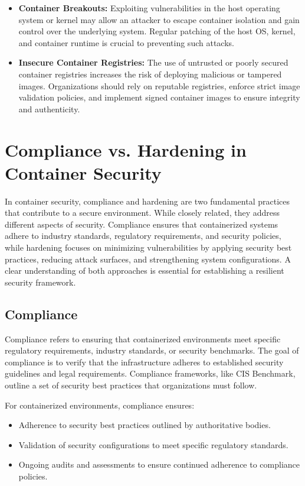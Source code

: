 \documentclass[12pt,a4paper]{report}
\begin{document}
\begin{itemize}
    \item \textbf{Container Breakouts:}  
    Exploiting vulnerabilities in the host operating system or kernel may allow an attacker to escape container isolation and gain control over the underlying system. Regular patching of the host OS, kernel, and container runtime is crucial to preventing such attacks.

    \item \textbf{Insecure Container Registries:}  
    The use of untrusted or poorly secured container registries increases the risk of deploying malicious or tampered images. Organizations should rely on reputable registries, enforce strict image validation policies, and implement signed container images to ensure integrity and authenticity.
\end{itemize}
\section{Compliance vs. Hardening in Container Security}

In container security, compliance and hardening are two fundamental practices that contribute to a secure environment. While closely related, they address different aspects of security. Compliance ensures that containerized systems adhere to industry standards, regulatory requirements, and security policies, while hardening focuses on minimizing vulnerabilities by applying security best practices, reducing attack surfaces, and strengthening system configurations. A clear understanding of both approaches is essential for establishing a resilient security framework.  

\subsection{Compliance}

Compliance refers to ensuring that containerized environments meet specific regulatory requirements, industry standards, or security benchmarks. The goal of compliance is to verify that the infrastructure adheres to established security guidelines and legal requirements. Compliance frameworks, like CIS Benchmark, outline a set of security best practices that organizations must follow. 


For containerized environments, compliance ensures:
\begin{itemize}
    \item Adherence to security best practices outlined by authoritative bodies.
    \item Validation of security configurations to meet specific regulatory standards.
    \item Ongoing audits and assessments to ensure continued adherence to compliance policies.
\end{itemize}
\end{document}
